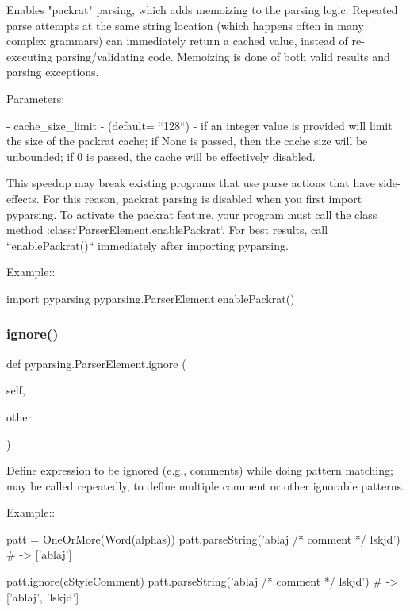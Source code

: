 \begin{DoxyVerb}Enables "packrat" parsing, which adds memoizing to the parsing logic.
   Repeated parse attempts at the same string location (which happens
   often in many complex grammars) can immediately return a cached value,
   instead of re-executing parsing/validating code.  Memoizing is done of
   both valid results and parsing exceptions.

   Parameters:

   - cache_size_limit - (default= ``128``) - if an integer value is provided
     will limit the size of the packrat cache; if None is passed, then
     the cache size will be unbounded; if 0 is passed, the cache will
     be effectively disabled.

   This speedup may break existing programs that use parse actions that
   have side-effects.  For this reason, packrat parsing is disabled when
   you first import pyparsing.  To activate the packrat feature, your
   program must call the class method :class:`ParserElement.enablePackrat`.
   For best results, call ``enablePackrat()`` immediately after
   importing pyparsing.

   Example::

       import pyparsing
       pyparsing.ParserElement.enablePackrat()
\end{DoxyVerb}
 \mbox{\label{classpyparsing_1_1ParserElement_ae091af36b550112da1a00aa314206d2d}} 
\subsubsection{\texorpdfstring{ignore()}{ignore()}}
{\footnotesize\ttfamily def pyparsing.\+Parser\+Element.\+ignore (\begin{DoxyParamCaption}\item[{}]{self,  }\item[{}]{other }\end{DoxyParamCaption})}

\begin{DoxyVerb}Define expression to be ignored (e.g., comments) while doing pattern
matching; may be called repeatedly, to define multiple comment or other
ignorable patterns.

Example::

    patt = OneOrMore(Word(alphas))
    patt.parseString('ablaj /* comment */ lskjd') # -> ['ablaj']

    patt.ignore(cStyleComment)
    patt.parseString('ablaj /* comment */ lskjd') # -> ['ablaj', 'lskjd']
\end{DoxyVerb}
 \mbox{\label{classpyparsing_1_1ParserElement_a353358c20d9ddcb673365ce17a79bc8c}} 
